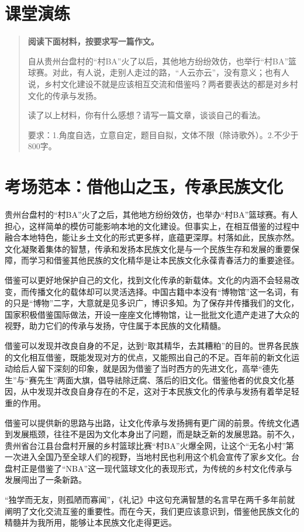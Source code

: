 \clearpage
\section*{课堂演练}
\begin{quote}
\textbf{阅读下面材料，按要求写一篇作文。}

自从贵州台盘村的“村BA”火了以后，其他地方纷纷效仿，也举行“村BA”篮球赛。对此，有人说，走别人走过的路，“人云亦云”，没有意义；也有人说，乡村文化建设不就是应该相互交流和借鉴吗？两者要表达的都是对乡村文化的传承与发扬。

读了以上材料，你有什么感想？请写一篇文章，谈谈自己的看法。

要求：1.角度自选，立意自定，题目自拟，文体不限（除诗歌外）。2.不少于800字。
\end{quote}

\section*{考场范本：借他山之玉，传承民族文化}

贵州台盘村的“村BA”火了之后，其他地方纷纷效仿，也举办“村BA”篮球赛。有人担心，这样简单的模仿可能影响本地的文化建设。但事实上，在相互借鉴的过程中融合本地特色，能让乡土文化的形式更多样，底蕴更深厚。村落如此，民族亦然。文化凝聚着集体的智慧，传承和发扬本民族文化是与一个民族生存和发展的重要保障，而学习和借鉴其他民族的文化精华是让本民族文化永葆青春活力的重要途径。

借鉴可以更好地保护自己的文化，找到文化传承的新载体。文化的内涵不会轻易改变，而传播文化的载体却可以灵活选择。中国古籍中本没有“博物馆”这一名词，有的只是“博物”二字，大意就是见多识广，博识多知。为了保存并传播我们的文化，国家积极借鉴国际做法，开设一座座文化博物馆，让一批批文化遗产走进了大众的视野，助力它们的传承与发扬，守住属于本民族的文化精髓。

借鉴可以发现并改良自身的不足，达到“取其精华，去其糟粕”的目的。世界各民族的文化相互借鉴，既能发现对方的优点，又能照出自己的不足。百年前的新文化运动给后人留下深刻的印象，就是因为借鉴了当时西方的先进文化，高举“德先生”与“赛先生”两面大旗，倡导祛除迂腐、落后的旧文化。借鉴他者的优良文化基因，从中发现并改良自身存在的不足，这对于本民族文化的传承与发扬有着举足轻重的作用。

借鉴可以提供新的思路与出路，让文化传承与发扬拥有更广阔的前景。传统文化遇到发展瓶颈，往往不是因为文化本身出了问题，而是缺乏新的发展思路。前不久，贵州省台江县台盘村开展的乡村篮球比赛“村BA”火爆全网，让这个“无名小村”第一次进入全国乃至全球人们的视野，当地村民也利用这个机会宣传了家乡文化。台盘村正是借鉴了“NBA”这一现代篮球文化的表现形式，为传统的乡村文化传承与发展闯出了一条新路。

“独学而无友，则孤陋而寡闻”，《礼记》中这句充满智慧的名言早在两千多年前就阐明了文化交流互鉴的重要性。而在今天，我们更应该意识到，借鉴他民族文化的精髓并为我所用，能够让本民族文化走得更远。
